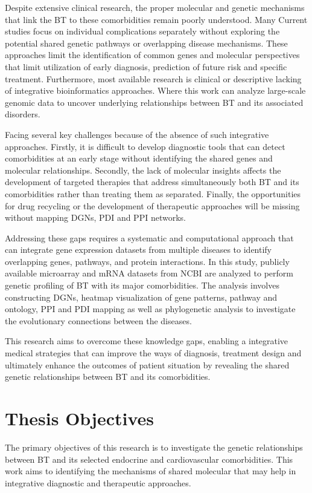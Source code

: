 Despite extensive clinical research, the proper molecular and genetic mechanisms that link the BT to these comorbidities remain poorly understood. Many Current studies focus on individual complications separately without exploring the potential shared genetic pathways or overlapping disease mechanisms. These approaches limit the identification of common genes and molecular perspectives that limit utilization of early diagnosis, prediction of future risk and specific treatment. Furthermore, most available research is clinical or descriptive lacking of integrative bioinformatics approaches. Where this work can analyze large-scale genomic data to uncover underlying relationships between BT and its associated disorders.

Facing several key challenges because of the absence of such integrative approaches. Firstly, it is difficult to develop diagnostic tools that can detect comorbidities at an early stage without identifying the shared genes and molecular relationships. Secondly, the lack of molecular insights affects the development of targeted therapies that address simultaneously both BT and its comorbidities rather than treating them as separated. Finally, the opportunities for drug recycling or the development of therapeutic approaches will be missing without mapping DGNs, PDI and PPI networks.

Addressing these gaps requires a systematic and computational approach that can integrate gene expression datasets from multiple diseases to identify overlapping genes, pathways, and protein interactions. In this study, publicly available microarray and mRNA datasets from NCBI are analyzed to perform genetic profiling of BT with its major comorbidities. The analysis involves constructing DGNs, heatmap visualization of gene patterns, pathway and ontology, PPI and PDI mapping as well as phylogenetic analysis to investigate the evolutionary connections between the diseases.

This research aims to overcome these knowledge gaps, enabling a integrative medical strategies that can improve the ways of diagnosis, treatment design and ultimately enhance the outcomes of patient situation by revealing the shared genetic relationships between BT and its comorbidities.


\section{Thesis Objectives}
\label{sec:sec01}

The primary objectives of this research is to investigate the genetic relationships between BT and its selected endocrine and cardiovascular comorbidities. This work aims to identifying the mechanisms of shared molecular that may help in integrative diagnostic and therapeutic approaches.

